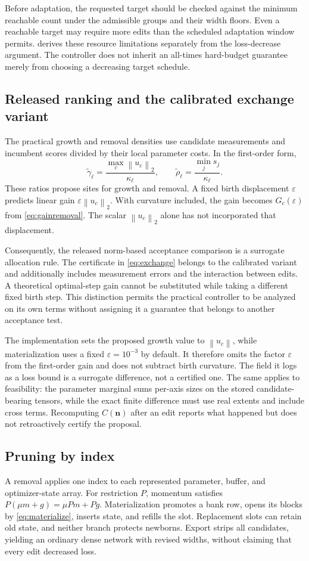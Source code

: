 \documentclass[10pt]{article}
\theoremstyle{paper}
\newcommand{\norm}[1]{\left\lVert #1\right\rVert}
\begin{document}
Before adaptation, the requested target should be checked against the minimum reachable count under the admissible groups and their width floors. Even a reachable target may require more edits than the scheduled adaptation window permits.  derives these resource limitations separately from the loss-decrease argument. The controller does not inherit an all-times hard-budget guarantee merely from choosing a decreasing target schedule.

\subsection{Released ranking and the calibrated exchange variant}
\label{app:certified-exchange}
The practical growth and removal densities use candidate measurements and incumbent scores divided by their local parameter costs. In the first-order form,
\[
\widetilde\gamma_\ell=\frac{\max_c\norm{u_c}_2}{\kappa_\ell},
\qquad \widetilde\rho_\ell=\frac{\min_js_j}{\kappa_\ell}.
\]
These ratios propose sites for growth and removal. A fixed birth displacement $\varepsilon$ predicts linear gain $\varepsilon\norm{u_c}_2$. With curvature included, the gain becomes $G_c(\varepsilon)$ from \cref{eq:gainremoval}. The scalar $\norm{u_c}_2$ alone has not incorporated that displacement.

Consequently, the released norm-based acceptance comparison is a surrogate allocation rule. The certificate in \cref{eq:exchange} belongs to the calibrated variant and additionally includes measurement errors and the interaction between edits. A theoretical optimal-step gain cannot be substituted while taking a different fixed birth step. This distinction permits the practical controller to be analyzed on its own terms without assigning it a guarantee that belongs to another acceptance test.

The implementation sets the proposed growth value to $\norm{u_c}$, while materialization uses a fixed $\varepsilon=10^{-3}$ by default. It therefore omits the factor $\varepsilon$ from the first-order gain and does not subtract birth curvature. The field it logs as a loss bound is a surrogate difference, not a certified one. The same applies to feasibility: the parameter marginal sums per-axis sizes on the stored candidate-bearing tensors, while the exact finite difference must use real extents and include cross terms. Recomputing $C(\bm n)$ after an edit reports what happened but does not retroactively certify the proposal.

\subsection{Pruning by index}
\label{app:pruning-edit}
A removal applies one index to each represented parameter, buffer, and optimizer-state array. For restriction $P$, momentum satisfies $P(\mu m+g)=\mu Pm+Pg$. Materialization promotes a bank row, opens its blocks by \cref{eq:materialize}, inserts state, and refills the slot. Replacement slots can retain old state, and neither branch protects newborns. Export strips all candidates, yielding an ordinary dense network with revised widths, without claiming that every edit decreased loss.
\end{document}
